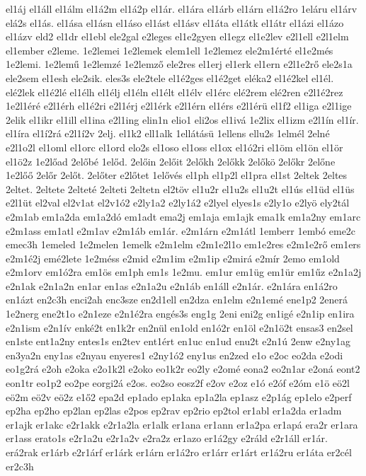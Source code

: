 {el1áj
el1áll
el1álm
el1á2m
el1á2p
el1ár.
el1ára
el1árb
el1árn
el1á2ro
1eláru
el1árv
elá2s
el1ás.
el1ása
el1ásn
el1áso
el1ást
el1ásv
el1áta
el1átk
el1átr
el1ázi
el1ázo
el1ázv
eld2
el1dr
el1ebl
ele2gal
e2leges
el1e2gyen
el1egz
el1e2lev
e2l1ell
e2l1elm
el1ember
e2leme.
1e2lemei
1e2lemek
elem1ell
1e2lemez
ele2m1érté
el1e2més
1e2lemi.
1e2lemű
1e2lemzé
1e2lemző
ele2res
el1erj
el1erk
el1ern
e2l1e2rő
ele2s1a
ele2sem
el1esh
ele2sik.
eles3s
ele2tele
el1é2ges
el1é2get
eléka2
el1é2kel
el1él.
elé2lek
el1é2lé
el1élh
el1élj
el1éln
el1élt
el1élv
el1érc
elé2rem
elé2ren
e2l1é2rez
1e2l1éré
e2l1érh
el1é2ri
e2l1érj
e2l1érk
e2l1érn
el1érs
e2l1érü
el1f2
el1iga
e2l1ige
2elik
el1ikr
el1ill
el1ina
e2l1ing
elin1n
elio1
eli2os
el1ivá
1e2lix
el1izm
e2l1ín
el1ír.
el1íra
el1í2rá
e2l1í2v
2elj.
el1k2
ell1alk
1ellátásü
1ellens
ellu2s
1elmél
2elné
e2l1o2l
el1oml
el1orc
el1ord
elo2s
el1oso
el1oss
el1ox
el1ó2ri
el1öm
el1ön
el1ör
el1ö2z
1e2lőad
2előbé
1előd.
2előin
2előit
2előkh
2előkk
2előkö
2előkr
2előne
1e2lőő
2előr
2előt.
2előter
e2lőtet
1elővés
el1ph
el1p2l
el1pra
el1st
2eltek
2eltes
2eltet.
2eltete
2elteté
2elteti
2eltetn
el2töv
el1u2r
el1u2s
el1u2t
el1ús
el1üd
el1üs
e2l1üt
el2val
el2v1at
el2v1ó2
e2ly1a2
e2ly1á2
e2lyel
elyes1s
e2ly1o
e2lyö
ely2tál
e2m1ab
em1a2da
em1a2dó
em1adt
ema2j
em1aja
em1ajk
ema1k
em1a2ny
em1arc
e2m1ass
em1atl
e2m1av
e2m1áb
em1ár.
e2m1árn
e2m1átl
1emberr
1embó
eme2c
emec3h
1emeled
1e2melen
1emelk
e2m1elm
e2m1e2l1o
em1e2res
e2m1e2rő
em1ers
e2m1é2j
emé2lete
1e2méss
e2mid
e2m1im
e2m1ip
e2mirá
e2mír
2emo
em1old
e2m1orv
em1ó2ra
em1ös
em1ph
em1s
1e2mu.
em1ur
em1üg
em1ür
em1űz
e2n1a2j
e2n1ak
e2n1a2n
en1ar
en1as
e2n1a2u
e2n1áb
en1áll
e2n1ár.
e2n1ára
en1á2ro
en1ázt
en2c3h
enci2ah
enc3sze
en2d1ell
en2dza
en1elm
e2n1emé
ene1p2
2enerá
1e2nerg
ene2t1o
e2n1eze
e2n1é2ra
engés3s
eng1g
2eni
eni2g
en1igé
e2n1ip
en1ira
e2n1ism
e2n1ív
enké2t
en1k2r
en2nül
en1old
en1ó2r
en1öl
e2n1ö2t
ensas3
en2sel
en1ste
ent1a2ny
entes1s
en2tev
ent1ért
en1uc
en1ud
enu2t
e2n1ú
2enw
e2ny1ag
en3ya2n
eny1as
e2nyau
enyeres1
e2ny1ó2
eny1us
en2zed
e1o
e2oc
eo2da
e2odi
eo1g2rá
e2oh
e2oka
e2o1k2l
e2oko
eo1k2r
eo2ly
e2omé
eona2
eo2n1ar
e2oná
eont2
eon1tr
eo1p2
eo2pe
eorgi2á
e2os.
eo2so
eosz2f
e2ov
e2oz
e1ó
e2óf
e2óm
e1ö
eö2l
eö2m
eö2v
eö2z
e1ő2
epa2d
ep1ado
ep1aka
ep1a2la
ep1asz
e2p1ág
ep1elo
e2perf
ep2ha
ep2ho
ep2lan
ep2las
e2pos
ep2rav
ep2rio
ep2tol
er1abl
er1a2da
er1adm
er1ajk
er1akc
e2r1akk
e2r1a2la
er1alk
er1ana
er1ann
er1a2pa
er1apá
era2r
er1ara
er1ass
erato1s
e2r1a2u
e2r1a2v
e2ra2z
er1azo
er1á2gy
e2ráld
e2r1áll
er1ár.
erá2rak
er1árb
e2r1árf
er1árk
er1árn
er1á2ro
er1árr
er1árt
er1á2ru
er1áta
er2cél
er2c3h
}
